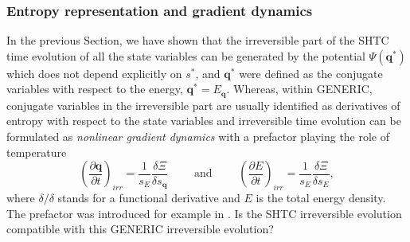 \documentclass[twoside]{article}
\newcommand{\qq}{{\boldsymbol{q}}}
\newcommand{\ted}{E} %
\newcommand{\pd}{\partial}
\newcommand{\IP}[1]{ \textcolor{blue}   {\small\texttt{
\texttt{[image: pin\_small.jpeg]} Ilya: #1}} }
\begin{document}





\subsubsection{Entropy representation and gradient dynamics}
In the previous Section, we have shown that the irreversible 
part of the SHTC time evolution of all the state variables %
can 
be 
generated by the potential $ \Psi(\qq^*) $ which does not depend explicitly on 
$ 
s^* $, and $ \qq^* $ were defined as the conjugate variables with respect 
to the energy, $ \qq^* = E_\qq $. Whereas, within GENERIC, conjugate variables 
in the irreversible 
part are usually identified as derivatives of 
entropy with respect to the state variables and irreversible time evolution can 
be 
formulated as 
\textit{nonlinear gradient dynamics} with a prefactor playing the role of 
temperature
\begin{equation}\label{eq.Generic.irr}
\left (\frac{\pd \qq}{\pd t}\right )_{irr} = \frac{1}{s_\ted}\frac{\delta 
\Xi}{\delta 
s_{\qq}} 
\qquad \text{ 
and } \qquad
\left (\frac{\pd \ted}{\pd t}\right )_{irr} = \frac{1}{s_\ted}\frac{\delta 
\Xi}{\delta 
s_\ted},
\end{equation}
where $\delta/\delta$ stands for a functional derivative and $\ted$ is the 
total 
energy density. The prefactor was introduced for example in \cite{PRE15}. Is 
the SHTC irreversible evolution compatible with this GENERIC irreversible 
evolution?
\end{document}
